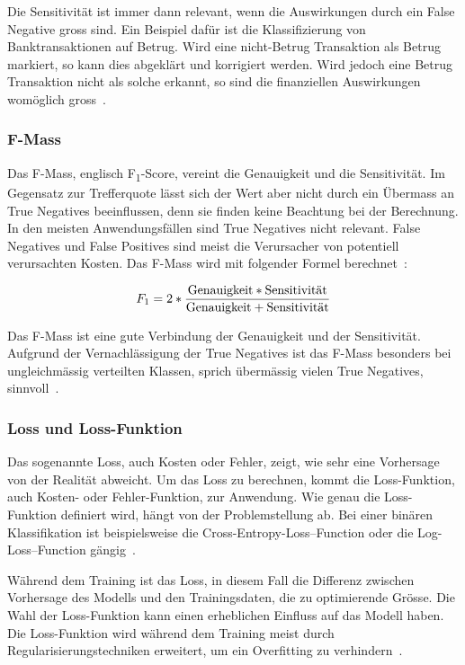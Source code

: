Die Sensitivität ist immer dann relevant, wenn die Auswirkungen durch ein False Negative gross sind. Ein Beispiel dafür ist die Klassifizierung von Banktransaktionen auf Betrug. Wird eine nicht-Betrug Transaktion als Betrug markiert, so kann dies abgeklärt und korrigiert werden. Wird jedoch eine Betrug Transaktion nicht als solche erkannt, so sind die finanziellen Auswirkungen womöglich gross~\autocite{TDSAccuracy}.

\subsubsection{F-Mass}
\label{chap:f1-score}

Das F-Mass, englisch F\textsubscript{1}-Score, vereint die Genauigkeit und die Sensitivität. Im Gegensatz zur Trefferquote lässt sich der Wert aber nicht durch ein Übermass an True Negatives beeinflussen, denn sie finden keine Beachtung bei der Berechnung. In den meisten Anwendungsfällen sind True Negatives nicht relevant. False Negatives und False Positives sind meist die Verursacher von potentiell verursachten Kosten. Das F-Mass wird mit folgender Formel berechnet~\autocite{TDSAccuracy}:

\nopagebreak

$$F_1=2 * \frac{\textnormal{Genauigkeit} * \textnormal{Sensitivität}}{\textnormal{Genauigkeit} + \textnormal{Sensitivität}}$$

Das F-Mass ist eine gute Verbindung der Genauigkeit und der Sensitivität. Aufgrund der Vernachlässigung der True Negatives ist das F-Mass besonders bei ungleichmässig verteilten Klassen, sprich übermässig vielen True Negatives, sinnvoll~\autocite{TDSAccuracy}.

\subsubsection{Loss und Loss-Funktion}

Das sogenannte Loss, auch Kosten oder Fehler, zeigt, wie sehr eine Vorhersage von der Realität abweicht. Um das Loss zu berechnen, kommt die Loss-Funktion, auch Kosten- oder Fehler-Funktion, zur Anwendung. Wie genau die Loss-Funktion definiert wird, hängt von der Problemstellung ab. Bei einer binären Klassifikation ist beispielsweise die Cross-Entropy-Loss–Function oder die Log-Loss–Function gängig~\autocite{TDSLoss}. 

Während dem Training ist das Loss, in diesem Fall die Differenz zwischen Vorhersage des Modells und den Trainingsdaten, die zu optimierende Grösse. Die Wahl der Loss-Funktion kann einen erheblichen Einfluss auf das Modell haben. Die Loss-Funktion wird während dem Training meist durch Regularisierungstechniken erweitert, um ein Overfitting zu verhindern~\autocite{Goodfellow2016}.

